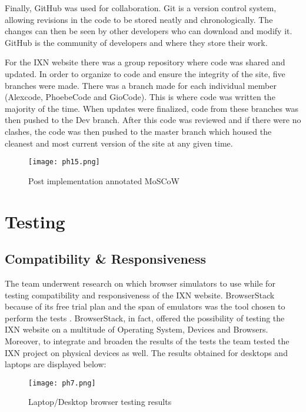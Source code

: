 Finally, GitHub was used for collaboration. Git is a version control
system, allowing revisions in the code to be stored neatly and
chronologically. The changes can then be seen by other developers who
can download and modify it. \cite{p20} GitHub is the community of
developers and where they store their work.

For the IXN website there was a group repository where code was shared
and updated. In order to organize to code and ensure the integrity of
the site, five branches were made. There was a branch made for each
individual member (Alexcode, PhoebeCode and GioCode). This is where code
was written the majority of the time. When updates were finalized, code
from these branches was then pushed to the Dev branch. After this code
was reviewed and if there were no clashes, the code was then pushed to
the master branch which housed the cleanest and most current version of
the site at any given time.

\begin{figure}[H]
      \centering
      \texttt{[image: ph15.png]}
      \caption{Post implementation annotated MoSCoW}
 \end{figure}

\hypertarget{testing}{%
\section{Testing}\label{testing}}

\hypertarget{compatibility-responsiveness}{%
\subsection{Compatibility \&
Responsiveness}\label{compatibility-responsiveness}}

The team underwent research on which browser simulators to use while for
testing compatibility and responsiveness of the IXN website.
BrowserStack because of its free trial plan and the span of emulators
was the tool chosen to perform the tests \cite{g6}. BrowserStack, in
fact, offered the possibility of testing the IXN website on a multitude
of Operating System, Devices and Browsers. Moreover, to integrate and
broaden the results of the tests the team tested the IXN project on
physical devices as well. The results obtained for desktops and laptops
are displayed below:

\begin{figure}[H]
      \centering
      \texttt{[image: ph7.png]}
      \caption{Laptop/Desktop browser testing results}
 \end{figure}

